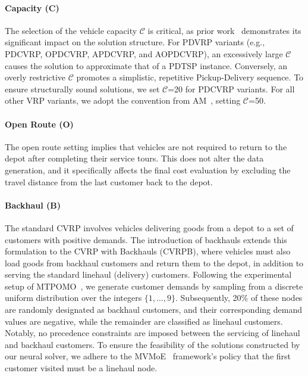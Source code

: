 \documentclass{article}
\theoremstyle{plain}
\theoremstyle{definition}
\theoremstyle{remark}
\begin{document}
\paragraph{Capacity (C)}
The selection of the vehicle capacity $\mathcal{C}$ is critical, as prior work~\citep{luo2025rethinking} demonstrates its significant impact on the solution structure. For PDVRP variants (e.g., PDCVRP, OPDCVRP, APDCVRP, and AOPDCVRP), an excessively large $\mathcal{C}$ causes the solution to approximate that of a PDTSP instance. Conversely, an overly restrictive $\mathcal{C}$ promotes a simplistic, repetitive Pickup-Delivery sequence. To ensure structurally sound solutions, we set $\mathcal{C}$=20 for PDCVRP variants. For all other VRP variants, we adopt the convention from AM~\citep{kool2019attention}, setting $\mathcal{C}$=50.

\paragraph{Open Route (O)}
The open route setting implies that vehicles are not required to return to the depot after completing their service tours. This does not alter the data generation, and it specifically affects the final cost evaluation by excluding the travel distance from the last customer back to the depot.
\paragraph{Backhaul (B)}
The standard CVRP involves vehicles delivering goods from a depot to a set of customers with positive demands. The introduction of backhauls extends this formulation to the CVRP with Backhauls (CVRPB), where vehicles must also load goods from backhaul customers and return them to the depot, in addition to serving the standard linehaul (delivery) customers. Following the experimental setup of MTPOMO~\citep{liu2024mtpomo}, we generate customer demands by sampling from a discrete uniform distribution over the integers $\{1, \ldots, 9\}$. Subsequently, 20\% of these nodes are randomly designated as backhaul customers, and their corresponding demand values are negative, while the remainder are classified as linehaul customers. Notably, no precedence constraints are imposed between the servicing of linehaul and backhaul customers. To ensure the feasibility of the solutions constructed by our neural solver, we adhere to the MVMoE~\citep{zhou2024mvmoe} framework's policy that the first customer visited must be a linehaul node.
\end{document}
